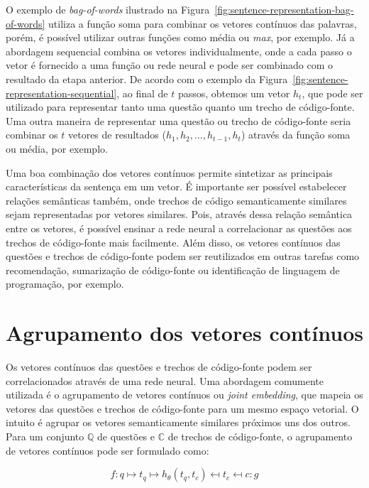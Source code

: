 O exemplo de \textit{bag-of-words} ilustrado na Figura~\ref{fig:sentence-representation-bag-of-words} utiliza a função soma para combinar os vetores contínuos das palavras, porém, é possível utilizar outras funções como média ou \emph{max}, por exemplo. Já a abordagem sequencial combina os vetores individualmente, onde a cada passo o vetor é fornecido a uma função ou rede neural e pode ser combinado com o resultado da etapa anterior. De acordo com o exemplo da Figura~\ref{fig:sentence-representation-sequential}, ao final de $t$ passos, obtemos um vetor $h_{t}$, que pode ser utilizado para representar tanto uma questão quanto um trecho de código-fonte. Uma outra maneira de representar uma questão ou trecho de código-fonte seria combinar os $t$ vetores de resultados ($h_{1}, h_{2}, ..., h_{t-1}, h_{t}$) através da função soma ou média, por exemplo. 

Uma boa combinação dos vetores contínuos permite sintetizar as principais características da sentença em um vetor. É importante ser possível estabelecer relações semânticas também, onde trechos de código semanticamente similares sejam representadas por vetores similares. Pois, através dessa relação semântica entre os vetores, é possível ensinar a rede neural a correlacionar as questões aos trechos de código-fonte mais facilmente. Além disso, os vetores contínuos das questões e trechos de código-fonte podem ser reutilizados em outras tarefas como recomendação, sumarização de código-fonte ou identificação de linguagem de programação, por exemplo.

\section{Agrupamento dos vetores contínuos}

Os vetores contínuos das questões e trechos de código-fonte podem ser correlacionados através de uma rede neural. Uma abordagem comumente utilizada é o agrupamento de vetores contínuos ou \textit{joint embedding}, que mapeia os vetores das questões e trechos de código-fonte para um mesmo espaço vetorial. O intuito é agrupar os vetores semanticamente similares próximos uns dos outros. Para um conjunto $\mathbb{Q}$ de questões e $\mathbb{C}$ de trechos de código-fonte, o agrupamento de vetores contínuos pode ser formulado como:

\begin{equation}
        f: q \mapsto t_{q} \mapsto h_{\theta}(t_{q}, t_{c}) \mapsfrom t_{c} \mapsfrom c :g
\end{equation}

